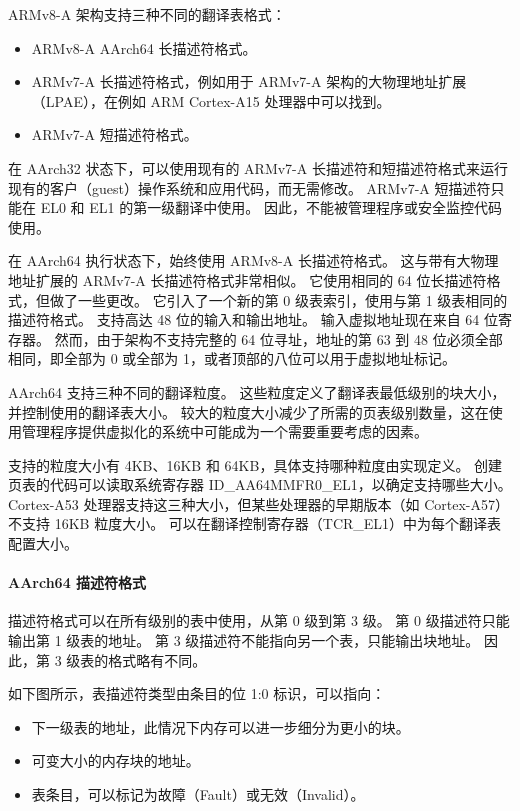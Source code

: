 ARMv8-A 架构支持三种不同的翻译表格式：

\begin{itemize}
\item
  ARMv8-A AArch64 长描述符格式。
\item
  ARMv7-A 长描述符格式，例如用于 ARMv7-A 架构的大物理地址扩展（LPAE），在例如 ARM Cortex-A15 处理器中可以找到。
\item
  ARMv7-A 短描述符格式。
\end{itemize}

在 AArch32 状态下，可以使用现有的 ARMv7-A 长描述符和短描述符格式来运行现有的客户（guest）操作系统和应用代码，而无需修改。
ARMv7-A 短描述符只能在 EL0 和 EL1 的第一级翻译中使用。
因此，不能被管理程序或安全监控代码使用。

在 AArch64 执行状态下，始终使用 ARMv8-A 长描述符格式。
这与带有大物理地址扩展的 ARMv7-A 长描述符格式非常相似。
它使用相同的 64 位长描述符格式，但做了一些更改。
它引入了一个新的第 0 级表索引，使用与第 1 级表相同的描述符格式。
支持高达 48 位的输入和输出地址。
输入虚拟地址现在来自 64 位寄存器。
然而，由于架构不支持完整的 64 位寻址，地址的第 63 到 48 位必须全部相同，即全部为 0 或全部为 1，或者顶部的八位可以用于虚拟地址标记。

AArch64 支持三种不同的翻译粒度。
这些粒度定义了翻译表最低级别的块大小，并控制使用的翻译表大小。
较大的粒度大小减少了所需的页表级别数量，这在使用管理程序提供虚拟化的系统中可能成为一个需要重要考虑的因素。

支持的粒度大小有 4KB、16KB 和 64KB，具体支持哪种粒度由实现定义。
创建页表的代码可以读取系统寄存器 ID\_AA64MMFR0\_EL1，以确定支持哪些大小。
Cortex-A53 处理器支持这三种大小，但某些处理器的早期版本（如 Cortex-A57）不支持 16KB 粒度大小。
可以在翻译控制寄存器（TCR\_EL1）中为每个翻译表配置大小。

\paragraph{AArch64 描述符格式}

描述符格式可以在所有级别的表中使用，从第 0 级到第 3 级。
第 0 级描述符只能输出第 1 级表的地址。
第 3 级描述符不能指向另一个表，只能输出块地址。
因此，第 3 级表的格式略有不同。

如下图所示，表描述符类型由条目的位 1:0 标识，可以指向：

\begin{itemize}
\item
  下一级表的地址，此情况下内存可以进一步细分为更小的块。
\item
  可变大小的内存块的地址。
\item
  表条目，可以标记为故障（Fault）或无效（Invalid）。
\end{itemize}

